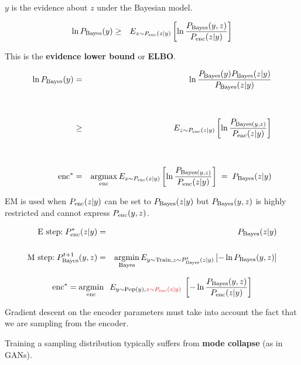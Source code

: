 {
$y$ is the evidence about $z$ under the Bayesian model.

\vfill
{\color{red}
{\huge
\begin{eqnarray*}
\ln P_{\mathrm{Bayes}}(y) & \geq & E_{z \sim P_{\mathrm{enc}}(z|y)}\left[\ln \frac{P_{\mathrm{Bayes}}(y,z)}{P_{\mathrm{enc}}(z|y)}\right]
\end{eqnarray*}
}}



\vfill
This is the {\bf evidence lower bound} or {\bf ELBO}.


{\color{red}
{\huge
\begin{eqnarray*}
\ln P_{\mathrm{Bayes}}(y) & =  & \ln \frac{P_{\mathrm{Bayes}}(y)P_{\mathrm{Bayes}}(z|y)}{P_{\mathrm{Bayes}}(z|y)} \\
\\
\\
& \geq & E_{z \sim P_{\mathrm{enc}}(z|y)}\left[\ln \frac{P_{\mathrm{Bayes}(y,z)}}{P_{\mathrm{enc}}(z|y)}\right] \\
\\
\\
\mathrm{enc}^* & = & \operatorname*{argmax}_{\mathrm{enc}} E_{z \sim P_{\mathrm{enc}}(z|y)}\left[\ln \frac{P_{\mathrm{Bayes}(y,z)}}{P_{\mathrm{enc}}(z|y)}\right] \;=\; P_{\mathrm{Bayes}}(z|y)
\end{eqnarray*}
}}



EM is used when $P_{\mathrm{enc}}(z|y)$ can be set to $P_{\mathrm{Bayes}}(z|y)$ but
$P_{\mathrm{Bayes}}(y,z)$ is highly restricted and cannot express $P_{\mathrm{enc}}(y,z)$.

{\huge
\vfill
\begin{eqnarray*}
\mbox{E step:}\;P_{\mathrm{enc}}^*(z|y) & = & P_{\mathrm{Bayes}}(z|y) \\
\\
\mbox{M step:}\;P_{\mathrm{Bayes}}^{t+1}(y,z) & = & \operatorname*{argmin}_{\mathrm{Bayes}} E_{y \sim \mathrm{Train}, z \sim P_{\mathrm{Bayes}}^t(z|y)} \left[-\ln P_{\mathrm{Bayes}}(y,z)\right]
\end{eqnarray*}
}



$$\mathrm{enc}^* = \operatorname*{argmin}_{\mathrm{enc}}\;\;E_{y\sim \mathrm{Pop}(y),{\color{red} z\sim P_{\mathrm{enc}}(z|y)}}\;\left[- \ln \frac{P_{\mathrm{Bayes}}(y,z)}{P_{\mathrm{enc}}(z|y)}\right]$$

\vfill
Gradient descent on the encoder parameters must take into account the fact that we are sampling from the encoder.

\vfill
Training a sampling distribution typically suffers from {\bf mode collapse} (as in GANs).

}
